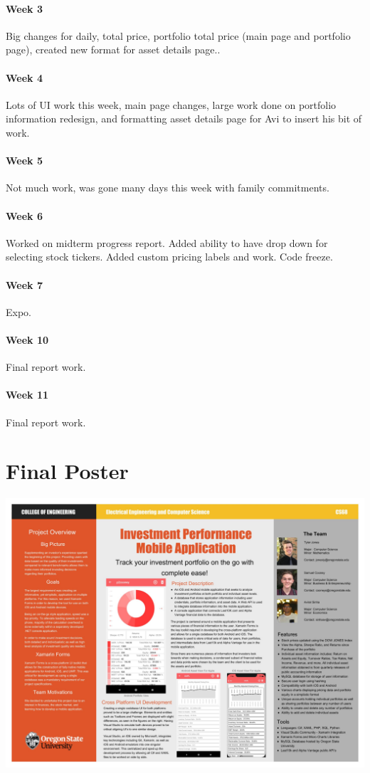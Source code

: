 \documentclass[onecolumn, draftclsnofoot,10pt, compsoc]{IEEEtran}
\begin{document}
\paragraph{Week 3}
Big changes for daily, total price, portfolio total price (main page and portfolio page), created new format for asset details page..
\paragraph{Week 4}
Lots of UI work this week, main page changes, large work done on portfolio information redesign, and formatting asset details page for Avi to insert his bit of work.
\paragraph{Week 5}
Not much work, was gone many days this week with family commitments.
\paragraph{Week 6}
Worked on midterm progress report. Added ability to have drop down for selecting stock tickers. Added custom pricing labels and work. Code freeze.
\paragraph{Week 7}
Expo.
\paragraph{Week 10}
Final report work.
\paragraph{Week 11}
Final report work.
    
\newpage
\section{Final Poster}

\includegraphics[scale=.25, angle=90]{poster.jpg}
\end{document}
